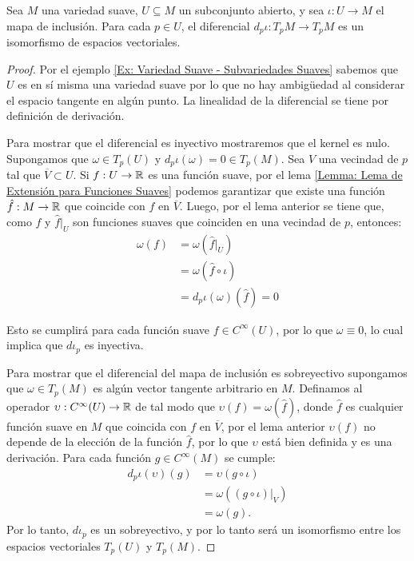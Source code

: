 \begin{lemma}\label{Lemma: Espacio Tangente a Subvariedad}
	Sea $M$ una variedad suave, $U \subseteq M$ un subconjunto abierto, y sea $\iota: U \to M$ el mapa de inclusión. Para cada $p \in U$, el diferencial $d_p\iota: T_p M \to T_pM$ es un isomorfismo de espacios vectoriales.
\end{lemma}

\begin{proof}
	Por el ejemplo \ref{Ex: Variedad Suave - Subvariedades Suaves} sabemos que $U$ es en sí misma una variedad suave por lo que no hay ambigüedad al considerar el espacio tangente en algún punto. La linealidad de la diferencial se tiene por definición de derivación.

	Para mostrar que el diferencial es inyectivo mostraremos que el kernel es nulo. Supongamos que $\omega \in T_{p}(U)$ y $d_p\iota(\omega) = 0 \in T_{p}(M)$. Sea $V$ una vecindad de $p$ tal que $\overline{V} \subset U$. Si $f: U \to \mathbb{R}$ es una función suave, por el lema \ref{Lemma: Lema de Extensión para Funciones Suaves} podemos garantizar que existe una función $\hat{f}: M \to \mathbb{R}$ que coincide con $f$ en $\overline{V}$. Luego, por el lema anterior se tiene que, como $f$ y $\hat{f}\big|_{U}$ son funciones suaves que coinciden en una vecindad de $p$, entonces:
	\begin{align*}
		\omega(f) & = \omega \left(\hat{f} \big|_{U} \right)\\
		          & = \omega(\hat{f} \circ \iota)   \\
		          & = d_p\iota(\omega)(\hat{f}) = 0
	\end{align*}

	Esto se cumplirá para cada función suave $f \in C^{\infty}(U)$, por lo que $\omega \equiv 0$, lo cual implica que $d\iota_p$ es inyectiva.

	Para mostrar que el diferencial del mapa de inclusión es sobreyectivo supongamos que $\omega \in T_p(M)$ es algún vector tangente arbitrario en $M$. Definamos al operador $\upsilon: C^{\infty}(U) \to \mathbb{R}$ de tal modo que $\upsilon(f) = \omega (\hat{f})$, donde $\hat{f}$ es cualquier función suave en $M$ que coincida con $f$ en $\overline{V}$, por el lema anterior $\upsilon(f)$ no depende de la elección de la función $\hat{f}$, por lo que $\upsilon$ está bien definida y es una derivación. Para cada función $g \in C^{\infty}(M)$ se cumple:
	\begin{align*}
		d_p\iota(\upsilon)(g)
		 & = \upsilon(g \circ \iota)                                  \\
		 & = \omega \left( (g \circ \iota) \big|_{V} \right) \\
		 & = \omega(g).
	\end{align*}
	Por lo tanto, $d\iota_p$ es un sobreyectivo, y por lo tanto será un isomorfismo entre los espacios vectoriales $T_p(U)$ y $T_p(M)$.
\end{proof}


